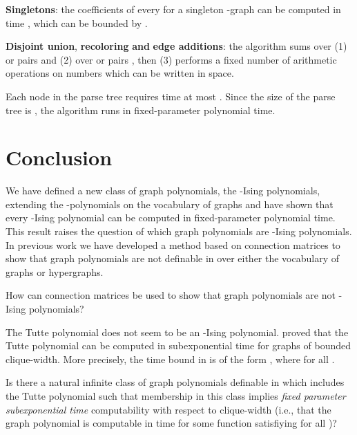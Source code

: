 \documentclass{llncs}
\begin{document}
\textbf{Singletons}: the coefficients of every  for a singleton -graph
can be computed in time , which can be bounded by . 

\textbf{Disjoint union},\textbf{ recoloring} \textbf{and} \textbf{edge
additions}: the algorithm sums over (1) 
or pairs 
and (2) over  or pairs
,
then (3) performs a fixed number of arithmetic operations on numbers
which can be written in  space. 

Each node in the parse tree requires time at most .
Since the size of the parse tree is , the algorithm
runs in fixed-parameter polynomial time. 


\section{Conclusion}

We have defined a new class of graph polynomials, the -Ising
polynomials, extending the -polynomials on the vocabulary
of graphs and have shown that every -Ising polynomial can
be computed in fixed-parameter polynomial time. This result raises
the question of which graph polynomials are -Ising polynomials.
In previous work \cite{pr:GKM08,pr:Makowsky09icla,ar:KM14connection}
we have developed a method based on connection matrices to show that graph
polynomials are not definable in  over either the vocabulary
of graphs or hypergraphs. 
\begin{problem}
How can connection matrices be used to show that graph polynomials
are not -Ising polynomials?
\end{problem}
The Tutte polynomial does not seem to be an -Ising polynomial.
\cite{gimenez2006computing} proved that the Tutte polynomial can
be computed in subexponential time for graphs of bounded clique-width. 
More precisely, the time bound in \cite{gimenez2006computing}
is of the form
, where  for all . 
\begin{problem}
Is there a natural infinite class of graph polynomials definable in
 which includes the Tutte polynomial such that membership
in this class implies {\em fixed parameter subexponential time} computability
with respect to clique-width
(i.e., that the graph polynomial is computable in 
time for some function  satisfiying  for all )?
\end{problem}
\end{document}
